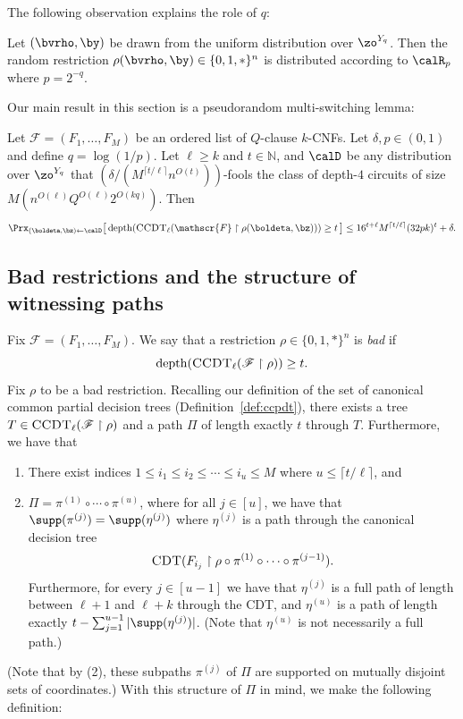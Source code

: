 \documentclass{toc}
\theoremstyle{plain}
\newcommand{\uhr}{\upharpoonright}
\newcommand{\CDT}{\textsc{CDT}}
\newcommand{\CCDT}{\textsc{CCDT}}
\newcommand{\depth}{\mathrm{depth}}
\renewcommand{\N}{\mathds{N}}
\begin{document}
The following observation explains the role of $q$: 


\begin{observation}
\label{obs:string-to-restriction}
Let $(\bvrho,\by)$ be drawn from the uniform distribution over $\zo^{Y_q}$.  Then the random restriction $\rho(\bvrho,\by) \in \{0,1,\ast\}^n$ is distributed according to $\calR_p$ where $p = 2^{-q}$.
\end{observation} 



Our main result in this section is a pseudorandom multi-switching lemma: 


\begin{theorem}
\label{thm:derand-H14}
Let $\mathscr{F} = (F_1,\ldots,F_M)$ be an ordered list of $Q$-clause $k$-CNFs. Let $\delta,p \in (0,1)$ and define $q = \log(1/p)$.  Let $\ell \geq k$ and $t\in \N$, and 
$\calD$ be any distribution over $\zo^{Y_q}$ that $(\delta/(M^{\lceil t/\ell\rceil} n^{O(t)}))$-fools the class of depth-$4$ circuits of size $M(n^{O(\ell)} Q^{O(\ell)} 2^{O(kq)})$.   Then
\[ \Prx_{(\boldeta,\bz)\leftarrow\calD}\big[\, \depth(\CCDT_{\ell}(\mathscr{F}\uhr\rho(\boldeta,\bz))) \ge t\,\big] \le 16^{t+\ell}M^{\lceil t/\ell\rceil} (32pk)^t + \delta. \]
 \end{theorem} 






\subsection{Bad restrictions and the structure of witnessing paths} 
\label{sec:bad-restrictions}

Fix $\mathscr{F} = (F_1,\ldots,F_M)$.  We say that a restriction $\rho \in \{0,1,\ast\}^n$ is \emph{bad}  if 
\[ \depth(\CCDT_{\ell}(\mathscr{F}\uhr\rho)) \ge t. \] 
Fix $\rho$ to be a bad restriction.
Recalling our definition of the set of canonical common partial decision trees (Definition~\ref{def:ccpdt}), there exists a tree $T \in \CCDT_\ell(\mathscr{F} \uhr \rho)$ and a path $\Pi$ of length exactly $t$ through $T$. Furthermore, we have that 
\begin{enumerate} 
\item There exist indices $1\le i_1 \le i_2 \le \cdots \le i_u \le M$ where $u \le \lceil t/\ell\rceil$, and 
\item $\Pi = \pi^{(1)} \circ \cdots \circ \pi^{(u)}$, where for all $j\in [u]$, we have that $\supp(\pi^{(j)}) =  \supp(\eta^{(j)})$ where  $\eta^{(j)}$ is a path through the canonical decision tree 
\[ \CDT(F_{i_j} \uhr \rho \circ \pi^{(1)}\circ\cdots\circ \pi^{(j-1)}).\]  
Furthermore, for every $j\in [u-1]$ we have that $\eta^{(j)}$ is a full path of length between $\ell+1$ and $\ell+k$ through the CDT, and $\eta^{(u)}$ is a path of length exactly $t - \sum_{j=1}^{u-1} |\supp(\eta^{(j)})|$. (Note that $\eta^{(u)}$ is not necessarily a full path.)
\end{enumerate}  
(Note that by (2), these subpaths $\pi^{(j)}$ of $\Pi$ are supported on mutually disjoint sets of coordinates.) With this structure of  $\Pi$ in mind, we make the following definition: 
\end{document}
